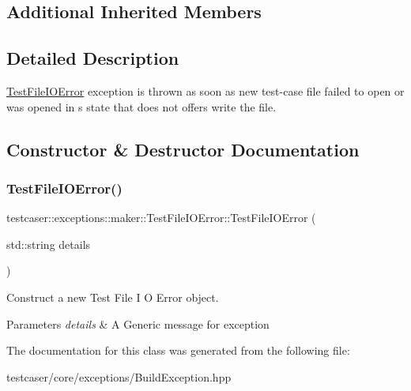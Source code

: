 \subsection*{Additional Inherited Members}


\subsection{Detailed Description}
\hyperlink{classtestcaser_1_1exceptions_1_1maker_1_1TestFileIOError}{Test\+File\+I\+O\+Error} exception is thrown as soon as new test-\/case file failed to open or was opened in s state that does not offers write the file. 

\subsection{Constructor \& Destructor Documentation}
\mbox{\label{classtestcaser_1_1exceptions_1_1maker_1_1TestFileIOError_a2168ea54454727b86b6e00e5cd8103e0}} 
\subsubsection{\texorpdfstring{Test\+File\+I\+O\+Error()}{TestFileIOError()}}
{\footnotesize\ttfamily testcaser\+::exceptions\+::maker\+::\+Test\+File\+I\+O\+Error\+::\+Test\+File\+I\+O\+Error (\begin{DoxyParamCaption}\item[{std\+::string}]{details }\end{DoxyParamCaption})\hspace{0.3cm}{\ttfamily [inline]}}



Construct a new Test File I O Error object. 


\begin{DoxyParams}{Parameters}
{\em details} & A Generic message for exception \\
\hline
\end{DoxyParams}


The documentation for this class was generated from the following file\+:\begin{DoxyCompactItemize}
\item 
testcaser/core/exceptions/Build\+Exception.\+hpp\end{DoxyCompactItemize}
